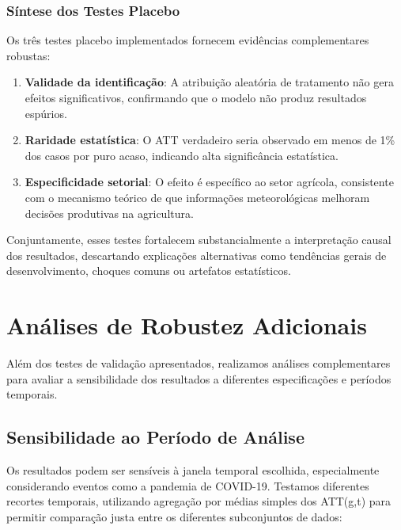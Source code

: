 \documentclass[
	12pt,				%
	oneside,			%
	a4paper,			%
	english,			%
	french,				%
	spanish,			%
	brazil				%
	]{abntex2}
\begin{document}
\subsubsection{Síntese dos Testes Placebo}

Os três testes placebo implementados fornecem evidências complementares robustas:

\begin{enumerate}
\item \textbf{Validade da identificação}: A atribuição aleatória de tratamento não gera efeitos significativos, confirmando que o modelo não produz resultados espúrios.

\item \textbf{Raridade estatística}: O ATT verdadeiro seria observado em menos de 1\% dos casos por puro acaso, indicando alta significância estatística.

\item \textbf{Especificidade setorial}: O efeito é específico ao setor agrícola, consistente com o mecanismo teórico de que informações meteorológicas melhoram decisões produtivas na agricultura.
\end{enumerate}

Conjuntamente, esses testes fortalecem substancialmente a interpretação causal dos resultados, descartando explicações alternativas como tendências gerais de desenvolvimento, choques comuns ou artefatos estatísticos.

\section{Análises de Robustez Adicionais}

Além dos testes de validação apresentados, realizamos análises complementares para avaliar a sensibilidade dos resultados a diferentes especificações e períodos temporais.

\subsection{Sensibilidade ao Período de Análise}

Os resultados podem ser sensíveis à janela temporal escolhida, especialmente considerando eventos como a pandemia de COVID-19. Testamos diferentes recortes temporais, utilizando agregação por médias simples dos ATT(g,t) para permitir comparação justa entre os diferentes subconjuntos de dados:
\end{document}

